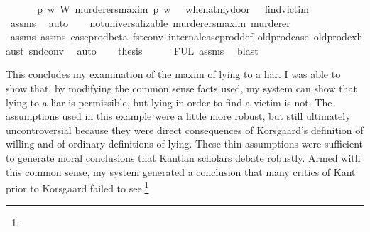 \begin{isabellebody}
%
\endisadelimproof
%
\isatagproof
{}\isamarkupfalse%
\ {\isacharminus}\ \isanewline
\ \ \isamarkupfalse%
\ {\isachardoublequoteopen}{\isacharparenleft}{\isasymforall}p\ w{\isachardot}\ {\isacharparenleft}W\ murderers{\isacharunderscore}maxim\ p{\isacharparenright}\ w{\isacharparenright}\ {\isasymlongrightarrow}\ {\isacharparenleft}{\isasymTurnstile}\ {\isacharparenleft}when{\isacharunderscore}at{\isacharunderscore}my{\isacharunderscore}door\ \isactrlbold {\isasymrightarrow}\ {\isacharparenleft}\isactrlbold {\isasymnot}\ find{\isacharunderscore}victim{\isacharparenright}{\isacharparenright}{\isacharparenright}{\isachardoublequoteclose}\isanewline
\ \ \ \ \isamarkupfalse%
\ assms{\isacharparenleft}{}{\isacharparenright}\ \isamarkupfalse%
\ auto\isanewline
\ \ \isamarkupfalse%
\ {\isachardoublequoteopen}not{\isacharunderscore}universalizable\ murderers{\isacharunderscore}maxim\ murderer{\isachardoublequoteclose}\isanewline
\ \ \ \ \isamarkupfalse%
\ assms{\isacharparenleft}{}{\isacharparenright}\ assms{\isacharparenleft}{}{\isacharparenright}\ case{\isacharunderscore}prod{\isacharunderscore}beta\ fst{\isacharunderscore}conv\ internal{\isacharunderscore}case{\isacharunderscore}prod{\isacharunderscore}def\ old{\isachardot}prod{\isachardot}case\ old{\isachardot}prod{\isachardot}exhaust\ snd{\isacharunderscore}conv\ \isamarkupfalse%
\ auto\isanewline
\ \ \isamarkupfalse%
\ {\isacharquery}thesis\isanewline
\ \ \ \ \isamarkupfalse%
\ FUL\ assms{\isacharparenleft}{}{\isacharparenright}\ \isamarkupfalse%
\ blast\ \isanewline
{}\isamarkupfalse%
%
\endisatagproof
{\isafoldproof}%
%
\isadelimproof
%
\endisadelimproof
%
\begin{isamarkuptext}%
This concludes my examination of the maxim of lying to a liar. I was able to show that, by
modifying the common sense facts used, my system can show that lying to a liar is permissible, but lying 
in order to find a victim is not. The assumptions used in this example were a little more robust, but still
ultimately uncontroversial because they were direct consequences of Korsgaard's definition of willing 
and of ordinary definitions of lying. These thin assumptions were sufficient to generate moral conclusions
that Kantian scholars debate robustly. Armed with this common sense, my system generated 
a conclusion that many critics of Kant prior to Korsgaard failed to see.\footnote{
}
\end{isamarkuptext}
\end{isabellebody}
